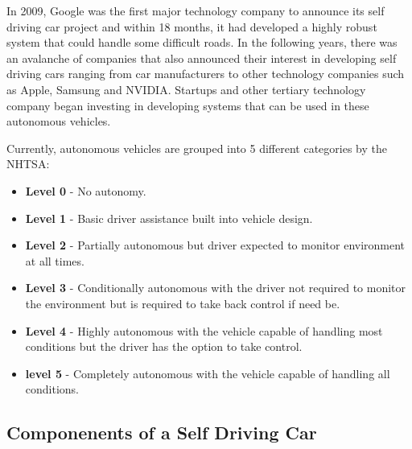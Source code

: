 In 2009, Google was the first major technology company to announce its self driving car project and within 18 months, it had developed a highly robust system that could handle some difficult roads. In the following years, there was an avalanche of companies that also announced their interest in developing self driving cars ranging from car manufacturers to other technology companies such as Apple, Samsung and NVIDIA.
Startups and other tertiary technology company began investing in developing systems that can be used in these autonomous vehicles. 

Currently, autonomous vehicles are grouped into 5 different categories by the NHTSA:
\begin{itemize}
    \item \textbf{Level 0} - No autonomy. 
    \item \textbf{Level 1} - Basic driver assistance built into vehicle design.
    \item \textbf{Level 2} - Partially autonomous but driver expected to monitor environment at all times.
    \item \textbf{Level 3} - Conditionally autonomous with the driver not required to monitor the environment but is required to take back control if need be.
    \item \textbf{Level 4} - Highly autonomous with the vehicle capable of handling most conditions but the driver has the option to take control. 
    \item \textbf{level 5} - Completely autonomous with the vehicle capable of handling all conditions.
\end{itemize}





\subsection{Componenents of a Self Driving Car}

